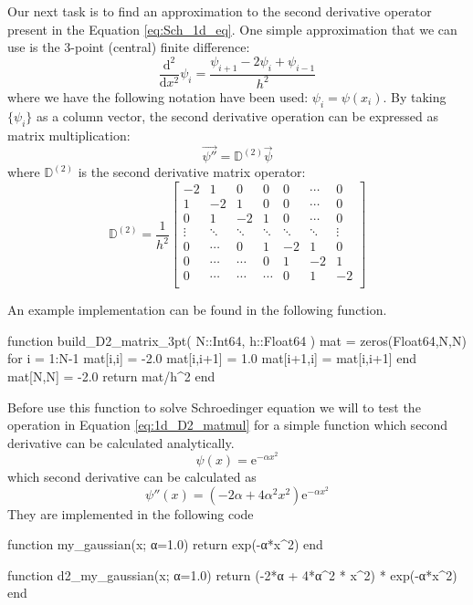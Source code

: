 Our next task is to find an approximation to the second derivative operator
present in the Equation \eqref{eq:Sch_1d_eq}.
One simple approximation that we can use is the 3-point (central) finite difference:
\begin{equation}
\frac{\mathrm{d}^2}{\mathrm{d}x^2} \psi_{i} =
\frac{\psi_{i+1} - 2\psi_{i} + \psi_{i-1}}{h^2}
\end{equation}
where we have the following notation have been used: $\psi_{i} = \psi(x_{i})$.
%
By taking $\{ \psi_{i} \}$ as a column vector, the second derivative operation
can be expressed as matrix multiplication:
\begin{equation}
\vec{\psi''} = \mathbb{D}^{(2)} \vec{\psi}
\end{equation}
where $\mathbb{D}^{(2)}$ is the second derivative matrix operator:
\begin{equation}
\mathbb{D}^{(2)} = \frac{1}{h^2}
\begin{bmatrix}
-2  &  1  &  0  &  0  & 0 & \cdots & 0 \\
 1  & -2  &  1  &  0  & 0 & \cdots & 0 \\
 0  &  1  & -2  &  1  & 0 & \cdots & 0 \\
 \vdots  &  \ddots  &  \ddots  & \ddots  & \ddots  & \ddots & \vdots \\
 0 & \cdots & 0 & 1 & -2 & 1 & 0 \\
 0  &  \cdots  & \cdots & 0  & 1  & -2  & 1 \\
 0  &  \cdots  & \cdots & \cdots & 0  &  1  & -2 \\
\end{bmatrix}
\label{eq:1d_D2_matmul}
\end{equation}

An example implementation can be found in the following function.
\begin{juliacode}
function build_D2_matrix_3pt( N::Int64, h::Float64 )
    mat = zeros(Float64,N,N)
    for i = 1:N-1
        mat[i,i] = -2.0
        mat[i,i+1] = 1.0
        mat[i+1,i] = mat[i,i+1]
    end
    mat[N,N] = -2.0
    return mat/h^2
end
\end{juliacode}


Before use this function to solve Schroedinger equation we will to test the operation
in Equation \eqref{eq:1d_D2_matmul} for a simple function which second derivative
can be calculated analytically.
\begin{equation}
\psi(x) = \mathrm{e}^{-\alpha x^2}
\end{equation}
%
which second derivative can be calculated as
%
\begin{equation}
\psi''(x) = \left( -2 \alpha + 4\alpha^2 x^2 \right) \mathrm{e}^{-\alpha x^2}
\end{equation}
%
They are implemented in the following code
\begin{juliacode}
function my_gaussian(x; α=1.0)
    return exp(-α*x^2)
end

function d2_my_gaussian(x; α=1.0)
    return (-2*α + 4*α^2 * x^2) * exp(-α*x^2)
end
\end{juliacode}

